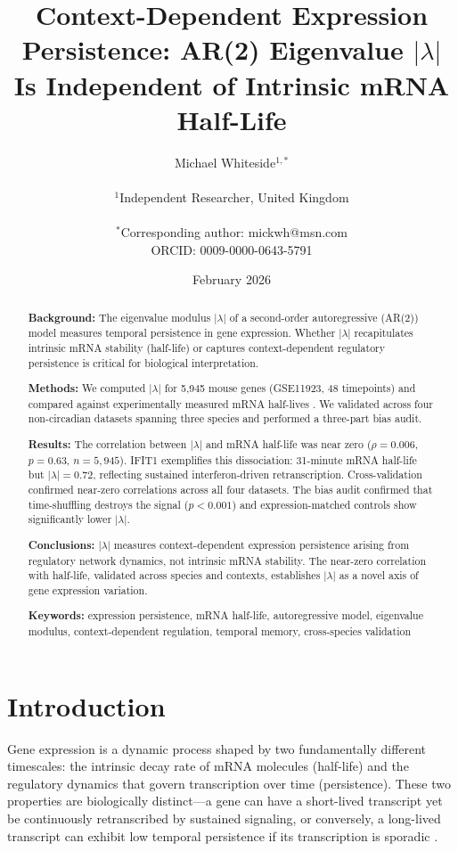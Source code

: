 \documentclass[11pt,letterpaper]{article}
\title{\textbf{Context-Dependent Expression Persistence: AR(2) Eigenvalue $|\lambda|$ Is Independent of Intrinsic mRNA Half-Life}}
\author{
Michael Whiteside$^{1,*}$ \\
\\
$^1$Independent Researcher, United Kingdom \\
\\
$^*$Corresponding author: mickwh@msn.com \\
ORCID: 0009-0000-0643-5791
}
\date{February 2026}
\begin{document}
\maketitle

\begin{abstract}
\noindent\textbf{Background:} The eigenvalue modulus $|\lambda|$ of a second-order autoregressive (AR(2)) model measures temporal persistence in gene expression. Whether $|\lambda|$ recapitulates intrinsic mRNA stability (half-life) or captures context-dependent regulatory persistence is critical for biological interpretation.

\noindent\textbf{Methods:} We computed $|\lambda|$ for 5,945 mouse genes (GSE11923, 48 timepoints) and compared against experimentally measured mRNA half-lives \citep{sharova2009database}. We validated across four non-circadian datasets spanning three species \citep{amit2009unbiased, tu2005logic, arbeitman2002gene, zaas2009gene} and performed a three-part bias audit.

\noindent\textbf{Results:} The correlation between $|\lambda|$ and mRNA half-life was near zero ($\rho = 0.006$, $p = 0.63$, $n = 5{,}945$). IFIT1 exemplifies this dissociation: 31-minute mRNA half-life but $|\lambda| = 0.72$, reflecting sustained interferon-driven retranscription. Cross-validation confirmed near-zero correlations across all four datasets. The bias audit confirmed that time-shuffling destroys the signal ($p < 0.001$) and expression-matched controls show significantly lower $|\lambda|$.

\noindent\textbf{Conclusions:} $|\lambda|$ measures context-dependent expression persistence arising from regulatory network dynamics, not intrinsic mRNA stability. The near-zero correlation with half-life, validated across species and contexts, establishes $|\lambda|$ as a novel axis of gene expression variation.

\noindent\textbf{Keywords:} expression persistence, mRNA half-life, autoregressive model, eigenvalue modulus, context-dependent regulation, temporal memory, cross-species validation
\end{abstract}

\section{Introduction}

Gene expression is a dynamic process shaped by two fundamentally different timescales: the intrinsic decay rate of mRNA molecules (half-life) and the regulatory dynamics that govern transcription over time (persistence). These two properties are biologically distinct---a gene can have a short-lived transcript yet be continuously retranscribed by sustained signaling, or conversely, a long-lived transcript can exhibit low temporal persistence if its transcription is sporadic \citep{schwanhausser2011global, rabani2011metabolic}.
\end{document}
